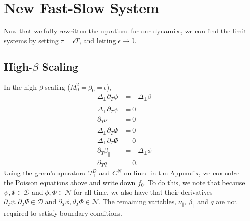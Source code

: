 \documentclass{article}
\newcommand{\para}{\parallel}
\newcommand{\ep}{\epsilon}
\newcommand{\lap}{\Delta_\perp}
\newcommand{\p}{\partial}
\newcommand{\GN}{G_\perp^N}
\newcommand{\GD}{G_\perp^D}
\begin{document}
\section{New Fast-Slow System}
Now that we fully rewritten the equations for our dynamics, we can find the limit systems by setting $\tau = \ep T$, and letting $\ep \to 0$.

\subsection{High-$\beta$ Scaling} \label{highbeta}
In the high-$\beta$ scaling ($M_0^2 = \beta_0 = \ep$), 
\begin{align}
    \lap \p_T \phi &= -\lap \beta_\para \\ 
    \lap \p_T\psi &= 0 \\ 
    \p_T\nu_\para &= 0 \\ 
    \lap \p_T\Phi &= 0 \\ 
    \lap \p_T\Psi &= 0 \\ 
    \p_T \beta_\para &= -\lap \phi \\ 
    \p_Tq &= 0.
\end{align} 
Using the green's operators $\GD$ and $\GN$ outlined in the Appendix, we can solve the Poisson equations above and write down $f_0$. To do this, we note that because $\psi,\Psi\in\mathcal{D}$ and $\phi,\Phi\in\mathcal{N}$ for all time, we also have that their derivatives $\p_T\psi, \p_T\Psi \in\mathcal{D}$ and $\p_T\phi, \p_T\Phi \in\mathcal{N}$. The remaining variables, $\nu_\para$, $\beta_\para$ and $q$ are not required to satisfy boundary conditions. 
\end{document}
